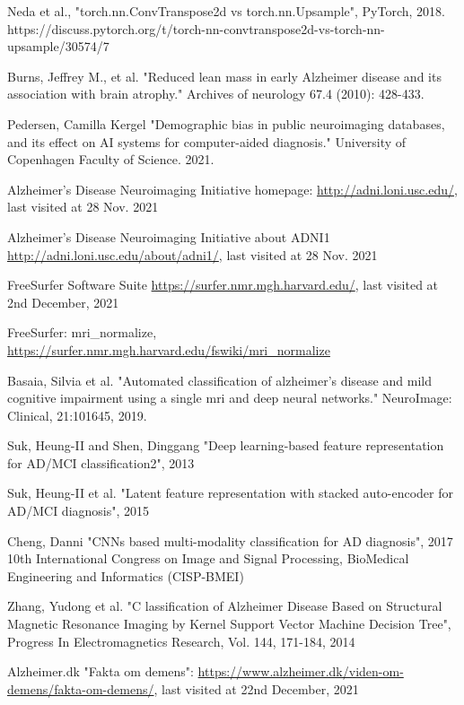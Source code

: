 \documentclass[12pt, fleqn, titlepage]{article}
\begin{document}
\begin{thebibliography}{9}
		 Neda et al., "torch.nn.ConvTranspose2d vs torch.nn.Upsample", PyTorch, 2018. https://discuss.pytorch.org/t/torch-nn-convtranspose2d-vs-torch-nn-upsample/30574/7
		
		 Burns, Jeffrey M., et al. "Reduced lean mass in early Alzheimer disease and its association with brain atrophy." Archives of neurology 67.4 (2010): 428-433.
		
		 Pedersen, Camilla Kergel "Demographic bias in public neuroimaging databases, and its effect on AI systems for computer-aided diagnosis." University of Copenhagen Faculty of Science. 2021.
		
		  Alzheimer’s
		Disease Neuroimaging Initiative homepage: \url{http://adni.loni.usc.edu/}, last visited at 
		28 Nov. 2021
		
		 Alzheimer’s
		Disease Neuroimaging Initiative about ADNI1 \url{http://adni.loni.usc.edu/about/adni1/}, last visited at 28 Nov. 2021
		
		 FreeSurfer Software Suite \url{https://surfer.nmr.mgh.harvard.edu/}, last visited at 2nd December, 2021
		
		 FreeSurfer: mri\_normalize, \url{https://surfer.nmr.mgh.harvard.edu/fswiki/mri_normalize}
		
		 Basaia, Silvia et al. "Automated classification of alzheimer’s disease and mild cognitive impairment using a
		single mri and deep neural networks." NeuroImage: Clinical, 21:101645, 2019.
		
		 Suk, Heung-II and Shen, Dinggang
		 "Deep learning-based feature representation for AD/MCI classification2", 2013
		 
		  Suk, Heung-II et al. "Latent feature representation with stacked auto-encoder for AD/MCI diagnosis", 2015
		
		 Cheng, Danni "CNNs based multi-modality classification for AD diagnosis", 2017 10th International Congress on Image and Signal Processing, BioMedical Engineering and Informatics (CISP-BMEI) 
		
		 Zhang, Yudong et al. "C	lassification of Alzheimer Disease Based on Structural Magnetic
		Resonance Imaging by Kernel Support Vector Machine Decision Tree", Progress In Electromagnetics Research, Vol. 144, 171-184, 2014
		
		 Alzheimer.dk "Fakta om demens": \url{https://www.alzheimer.dk/viden-om-demens/fakta-om-demens/}, last visited at 22nd December, 2021
		

\end{thebibliography}
\end{document}

